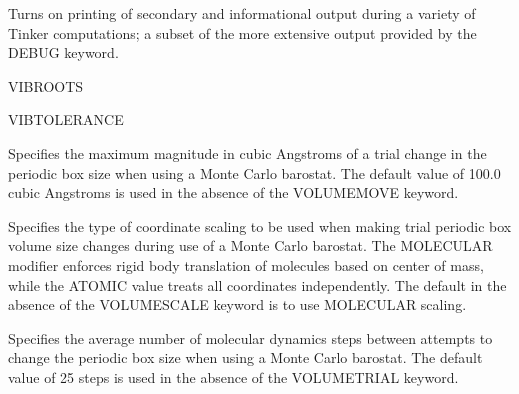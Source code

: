 \documentclass[letterpaper,11pt,english]{sphinxmanual}
\begin{document}
\ignorespaces {}\label{\detokenize{text/keywords:key-verbose}}\begin{description}
\sphinxAtStartPar
Turns on printing of secondary and informational output during a variety of Tinker computations; a subset of the more extensive output provided by the DEBUG keyword.

\end{description}

\ignorespaces {}\label{\detokenize{text/keywords:key-vib-roots}}
\sphinxAtStartPar
VIB\sphinxhyphen{}ROOTS

\ignorespaces {}\label{\detokenize{text/keywords:key-vib-tolerance}}
\sphinxAtStartPar
VIB\sphinxhyphen{}TOLERANCE

\ignorespaces {}\label{\detokenize{text/keywords:key-volume-move}}\begin{description}
\sphinxAtStartPar
Specifies the maximum magnitude in cubic Angstroms of a trial change in the periodic box size when using a Monte Carlo barostat. The default value of 100.0 cubic Angstroms is used in the absence of the VOLUME\sphinxhyphen{}MOVE keyword.

\end{description}

\ignorespaces {}\label{\detokenize{text/keywords:key-volume-scale}}\begin{description}
\sphinxAtStartPar
Specifies the type of coordinate scaling to be used when making trial periodic box volume size changes during use of a Monte Carlo barostat. The MOLECULAR modifier enforces rigid body translation of molecules based on center of mass, while the ATOMIC value treats all coordinates independently. The default in the absence of the VOLUME\sphinxhyphen{}SCALE keyword is to use MOLECULAR scaling.

\end{description}

\ignorespaces {}\label{\detokenize{text/keywords:key-volume-trial}}\begin{description}
\sphinxAtStartPar
Specifies the average number of molecular dynamics steps between attempts to change the periodic box size when using a Monte Carlo barostat. The default value of 25 steps is used in the absence of the VOLUME\sphinxhyphen{}TRIAL keyword.

\end{description}
\end{document}
